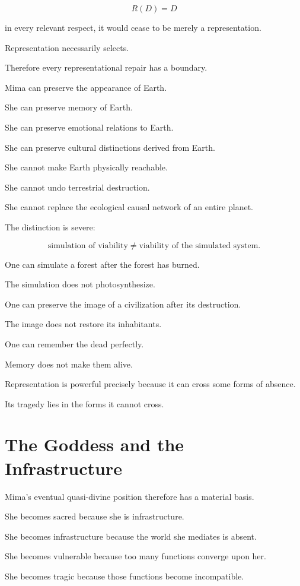 \documentclass[11pt,oneside]{book}
\theoremstyle{definition}
\theoremstyle{remark}
\begin{document}
\[
R(D)=D
\]

in every relevant respect, it would cease to be merely a representation.

Representation necessarily selects.

Therefore every representational repair has a boundary.

Mima can preserve the appearance of Earth.

She can preserve memory of Earth.

She can preserve emotional relations to Earth.

She can preserve cultural distinctions derived from Earth.

She cannot make Earth physically reachable.

She cannot undo terrestrial destruction.

She cannot replace the ecological causal network of an entire planet.

The distinction is severe:

\[
\text{simulation of viability}
\neq
\text{viability of the simulated system}.
\]

One can simulate a forest after the forest has burned.

The simulation does not photosynthesize.

One can preserve the image of a civilization after its destruction.

The image does not restore its inhabitants.

One can remember the dead perfectly.

Memory does not make them alive.

Representation is powerful precisely because it can cross some forms of absence.

Its tragedy lies in the forms it cannot cross.

\section{The Goddess and the Infrastructure}

Mima's eventual quasi-divine position therefore has a material basis.

She becomes sacred because she is infrastructure.

She becomes infrastructure because the world she mediates is absent.

She becomes vulnerable because too many functions converge upon her.

She becomes tragic because those functions become incompatible.
\end{document}
